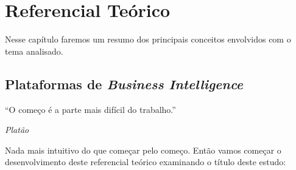 \chapter{Referencial Teórico}
\label{cap-referencial}

Nesse capítulo faremos um resumo dos principais conceitos envolvidos com o tema analisado.








\section{Plataformas de \emph{Business Intelligence}}
\label{sec-pĺataformasdebi}

\epigraph{``O começo é a parte mais difícil do trabalho.''}{\textit{Platão}}

Nada mais intuitivo do que começar pelo começo. Então vamos começar o desenvolvimento deste referencial teórico examinando o título deste estudo: 

